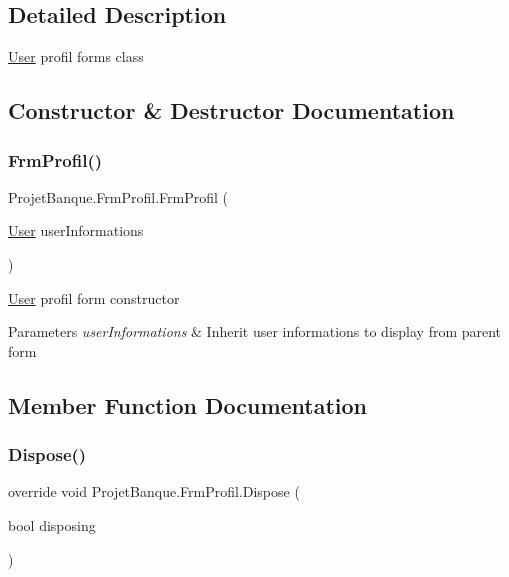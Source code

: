 \subsection{Detailed Description}
\mbox{\hyperlink{class_projet_banque_1_1_user}{User}} profil form\textquotesingle{}s class 



\subsection{Constructor \& Destructor Documentation}
\mbox{\label{class_projet_banque_1_1_frm_profil_ae572db7d815775f63882e2988fd4a52a}} 
\subsubsection{\texorpdfstring{FrmProfil()}{FrmProfil()}}
{\footnotesize\ttfamily Projet\+Banque.\+Frm\+Profil.\+Frm\+Profil (\begin{DoxyParamCaption}\item[{\mbox{\hyperlink{class_projet_banque_1_1_user}{User}}}]{user\+Informations }\end{DoxyParamCaption})}



\mbox{\hyperlink{class_projet_banque_1_1_user}{User}} profil form constructor 


\begin{DoxyParams}{Parameters}
{\em user\+Informations} & Inherit user informations to display from parent form\\
\hline
\end{DoxyParams}


\subsection{Member Function Documentation}
\mbox{\label{class_projet_banque_1_1_frm_profil_ae51ee9c4382f5e7bc5510b3d5d924a57}} 
\subsubsection{\texorpdfstring{Dispose()}{Dispose()}}
{\footnotesize\ttfamily override void Projet\+Banque.\+Frm\+Profil.\+Dispose (\begin{DoxyParamCaption}\item[{bool}]{disposing }\end{DoxyParamCaption})\hspace{0.3cm}{\ttfamily [protected]}}



